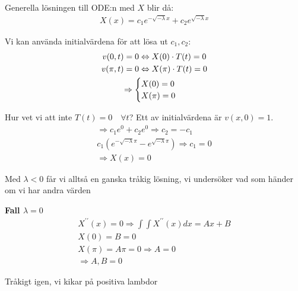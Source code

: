 \noindent Generella lösningen till ODE:n med $X$ blir då:
\begin{equation*}
  \begin{gathered}
    X(x) = c_1e^{-\sqrt{-\lambda}x}+c_2e^{\sqrt{-\lambda}x}
  \end{gathered}
\end{equation*}
\par\bigskip
\noindent Vi kan använda initialvärdena för att lösa ut $c_1,c_2$:
\begin{equation*}
  \begin{gathered}
    v(0,t) = 0\Leftrightarrow X(0)\cdot T(t) = 0\\
    v(\pi,t) = 0\Leftrightarrow X(\pi)\cdot T(t) = 0\\
    \Rightarrow\begin{cases}X(0) = 0\\X(\pi) = 0\end{cases}
  \end{gathered}
\end{equation*}\par
\noindent Hur vet vi att inte $T(t) = 0\quad\forall t$? Ett av initialvärdena är $v(x,0) = 1$.
\begin{equation*}
  \begin{gathered}
    \Rightarrow c_1e^{0}+c_2e^{0} \Rightarrow c_2 = -c_1\\
    c_1\left(e^{-\sqrt{-\lambda}\pi}-e^{\sqrt{-\lambda}\pi}\right)\Rightarrow c_1 = 0\\
    \Rightarrow X(x) = 0
  \end{gathered}
\end{equation*}
\par\bigskip
\noindent Med $\lambda<0$ får vi alltså en ganska tråkig lösning, vi undersöker vad som händer om vi har andra värden
\par\bigskip
\noindent\textbf{Fall $\lambda = 0$}
\begin{equation*}
  \begin{gathered}
    X^{\prime\prime}(x) = 0\Rightarrow \int\int X^{\prime\prime}(x) dx = Ax+B\\
    X(0) = B = 0\\
    X(\pi) = A\pi =0\Rightarrow A = 0\\
    \Rightarrow A,B = 0
  \end{gathered}
\end{equation*}
\par\bigskip
\noindent Tråkigt igen, vi kikar på positiva lambdor
\par\bigskip
